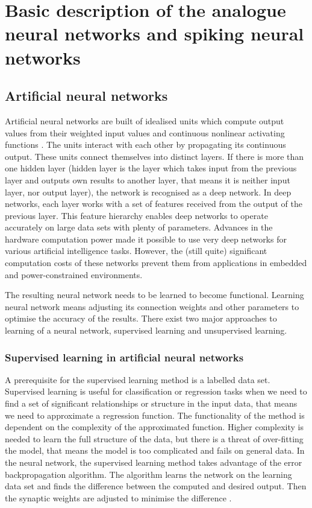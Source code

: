 \chapter{Basic description of the analogue neural networks and spiking neural networks} \label{chapter:02}

\section{Artificial neural networks}
Artificial neural networks are built of idealised units which compute output values from their weighted input values and continuous nonlinear activating functions \cite{tavanaeiDeepLearningSpiking2019}. The units interact with each other by propagating its continuous output. These units connect themselves into distinct layers. If there is more than one hidden layer (hidden layer is the layer which takes input from the previous layer and outputs own results to another layer, that means it is neither input layer, nor output layer), the network is recognised as a deep network. In deep networks, each layer works with a set of features received from the output of the previous layer. This feature hierarchy enables deep networks to operate accurately on large data sets with plenty of parameters. Advances in the hardware computation power made it possible to use very deep networks for various artificial intelligence tasks. However, the (still quite) significant computation costs of these networks prevent them from applications in embedded and power-constrained environments. \par
The resulting neural network needs to be learned to become functional. Learning neural network means adjusting its connection weights and other parameters to optimise the accuracy of the results. There exist two major approaches to learning of a neural network, supervised learning and unsupervised learning.

\subsection{Supervised learning in artificial neural networks}
A prerequisite for the supervised learning method is a labelled data set. Supervised learning is useful for classification or regression tasks when we need to find a set of significant relationships or structure in the input data, that means we need to approximate a regression function. The functionality of the method is dependent on the complexity of the approximated function. Higher complexity is needed to learn the full structure of the data, but there is a threat of over-fitting the model, that means the model is too complicated and fails on general data. In the neural network, the supervised learning method takes advantage of the error backpropagation algorithm. The algorithm learns the network on the learning data set and finds the difference between the computed and desired output. Then the synaptic weights are adjusted to minimise the difference \cite{sathyaComparisonSupervisedUnsupervised2013}.

